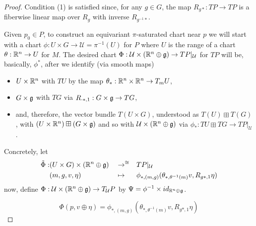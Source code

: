 \begin{proof}
Condition (1) is satisfied since, for any $g \in G$, the map $R_{g*}:TP \to TP$ is a fiberwise linear map over $R_g$ with inverse $R_{g^{-1} *}$.

Given $p_0 \in P$, to construct an equivariant $\pi$-saturated chart near $p$ we will start with a chart $\phi:U \times G \to \mathcal U = \pi^{-1}(U)$ for $P$ where $U$ is the range of a chart $\theta:\mathbb{R}^n \to U$ for $M$. The desired chart $\Phi: \mathcal U \times (\mathbb{R}^n \oplus \mathfrak{g}) \to TP|_{\mathcal U}$ for $TP$ will be, basically, $\phi^*$, after we identify (via smooth maps) 
    \begin{itemize}
    
    \item $U \times \mathbb{R}^n$ with $TU$ by the map $\theta_{*}: \mathbb{R}^n \times \mathbb{R}^n \to T_m U$,  
    
    \item $G \times \mathfrak{g}$ with $TG$ via $R_{\cdot *, 1}: G \times \mathfrak{g} \to T G$,
    
    \item and, therefore, the vector bundle $T(U \times G)$, understood as $T(U) \boxplus T(G)$, with $(U \times \mathbb{R}^n) \boxplus (G \times \mathfrak{g})$ and so with $\mathcal U \times (\mathbb{R}^n \oplus \mathfrak{g})$ via $\phi_*: TU \boxplus TG \to TP|_{\mathcal U}$.
    
    \end{itemize}

Concretely, let
\begin{align*}
    \Tilde \Phi :& (U \times G) \times (\RR^n \oplus \alg g) && \to^{\cong} && TP|_{\mathcal U} \\    
                 & (m, g, v, \eta)&& \mapsto &&\phi_{*, (m, g)}(\theta_{*, \theta^{-1}(m)} v, R_{g*, 1} \eta) 
\end{align*}
now, define $\Phi : \mathcal U \times (\mathbb{R}^n \oplus \mathfrak{g})  \to  T_{\mathcal U}P$ by $\Psi = \phi^{-1} \times id_{\RR^n \oplus \alg g}$. %

\[
    \Phi(p, v \oplus \eta) = \phi_{*, (m, g)}(\theta_{*, \theta^{-1}(m)} v, R_{g*, 1} \eta)
\]


\end{proof}
